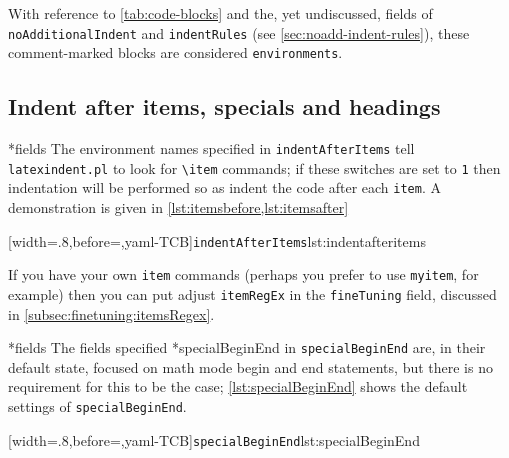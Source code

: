  With reference to \vref{tab:code-blocks} and the, yet undiscussed, fields of
 \texttt{noAdditionalIndent} and \texttt{indentRules} (see
 \vref{sec:noadd-indent-rules}), these comment-marked blocks are considered
 \texttt{environments}.

\subsection{Indent after items, specials and headings}
*{fields}
 The environment names specified in \texttt{indentAfterItems} tell
 \texttt{latexindent.pl} to look for \lstinline!\item! commands; if these switches are
 set to \texttt{1} then indentation will be performed so as indent the code after each
 \texttt{item}. A demonstration is given in \cref{lst:itemsbefore,lst:itemsafter}

 \begin{cmhtcbraster}[raster columns=3,
   raster left skip=-3.5cm,
   raster right skip=-2cm,
   raster column skip=.03\linewidth]
  [width=.8\linewidth,before=\centering,yaml-TCB]{\texttt{indentAfterItems}}{lst:indentafteritems}
 \end{cmhtcbraster}

 If you have your own \texttt{item} commands (perhaps you prefer to use \texttt{myitem},
 for example) then you can put adjust \texttt{itemRegEx} in the \texttt{fineTuning}
 field, discussed in
 \vref{subsec:finetuning:itemsRegex}.

*{fields}\label{yaml:specialBeginEnd}
 The fields specified 
 *{specialBeginEnd} in \texttt{specialBeginEnd} are, in their
 default state, focused on math mode begin and end statements, but there is no
 requirement for this to be the case; \cref{lst:specialBeginEnd} shows the default
 settings of \texttt{specialBeginEnd}. 

 [width=.8\linewidth,before=\centering,yaml-TCB]{\texttt{specialBeginEnd}}{lst:specialBeginEnd}

